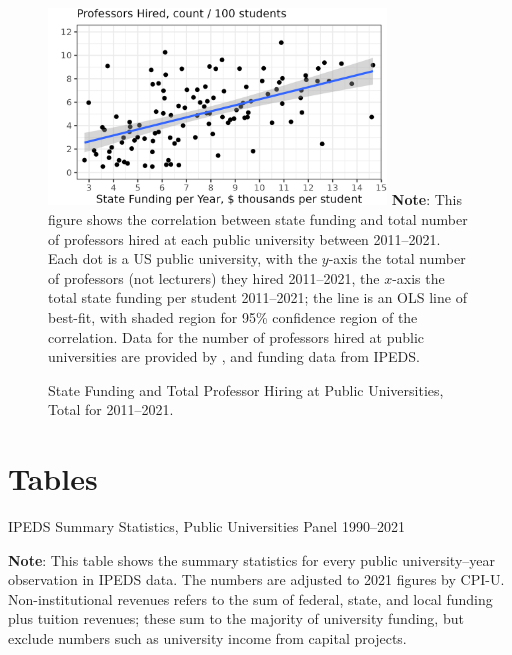 \begin{figure}[H]
    \centering
    \singlespacing
    \caption{State Funding and Total Professor Hiring at Public Universities, Total for 2011--2021.}
    \includegraphics[width=0.8\textwidth]{figures/hiring-correlation.png}
    \label{fig:hiring-correlation}
    \justify
    \footnotesize
    \textbf{Note}:
    This figure shows the correlation between state funding and total number of professors hired at each public university between 2011--2021.
    Each dot is a US public university, with the $y$-axis the total number of professors (not lecturers) they hired 2011--2021, the $x$-axis the total state funding per student 2011--2021; the line is an OLS line of best-fit, with shaded region for 95\% confidence region of the correlation.
    Data for the number of professors hired at public universities are provided by \cite{wapman2022quantifying,wapman2022zenodo}, and funding data from IPEDS.
\end{figure}



\section{Tables}
\label{sec:tables}

\begin{table}[H]
    \singlespacing
    \caption{IPEDS Summary Statistics, Public Universities Panel 1990--2021}
    \makebox[\textwidth][c]{}
    \label{tab:ipeds-summary}
    \justify
    \footnotesize
    \textbf{Note}:
    This table shows the summary statistics for every public university--year observation in IPEDS data.
    The numbers are adjusted to 2021 figures by CPI-U.
    Non-institutional revenues refers to the sum of federal, state, and local funding plus tuition revenues; these sum to the majority of university funding, but exclude numbers such as university income from capital projects.
\end{table}

